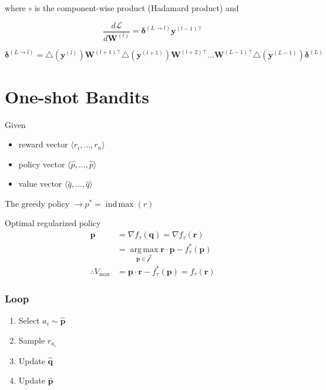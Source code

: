 \documentclass[10pt]{article}
\newcommand{\indmax}{\operatorname{ind\,max}}
\newcommand{\argmax}{\operatorname{arg\,max}}
\theoremstyle{definition}
\begin{document}
\noindent
where $\circ$ is the component-wise product (Hadamard product) and

\begin{equation*}
\frac{d\mathcal{L}}{d\mathbf{W}^{(l)}} = \pmb{\delta}^{(L\rightarrow l)}\mathbf{y}^{(l-1)\top}
\end{equation*}

\begin{equation*}
\pmb{\delta}^{(L\rightarrow l)} = \triangle(\mathbf{y}^{(l)})\mathbf{W}^{(l+1)\top}\triangle(\mathbf{y}^{(l+1)})\mathbf{W}^{(l+2)\top}\hdots\mathbf{W}^{(L-1)\top}\triangle(\mathbf{y}^{(L-1)})\pmb{\delta}^{(L)}
\end{equation*}

\section*{One-shot Bandits}

Given

\begin{itemize}
\item reward vector $\langle r_i, \hdots, r_n \rangle$
\item policy vector $\langle \hat{p}, \hdots, \hat{p} \rangle$
\item value vector $\langle \hat{q}, \hdots, \hat{q} \rangle$
\end{itemize}

The greedy policy $\rightarrow p^* = \indmax(r)$

Optimal regularized policy 
\begin{equation*}
\begin{aligned}
\mathbf{p} & = \nabla f_{\tau}(\textbf{q}) = \nabla f_{\tau}(\mathbf{r}) \\
& = \argmax\limits_{\mathbf{p} \in \mathcal{f}^*} \mathbf{r}\cdot \mathbf{p} - f^*_{\tau}(\mathbf{p}) \\
\therefore V_{\text{max}} & = \mathbf{p}\cdot \mathbf{r} - f^*_{\tau}(\mathbf{p}) = f_{\tau}(\mathbf{r})
\end{aligned}
\end{equation*}

\subsubsection*{Loop}
\begin{enumerate}
\item Select $a_i \sim \mathbf{\hat{p}}$
\item Sample $r_{a_i}$
\item Update $\mathbf{\hat{q}}$
\item Update $\mathbf{\hat{p}}$
\end{enumerate}
\end{document}
